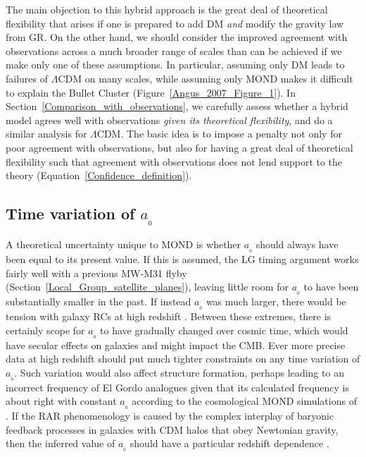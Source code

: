 \documentclass[fleqn,usenatbib,useAMS]{mnras} %
\begin{document}
The main objection to this hybrid approach is the great deal of theoretical flexibility that arises if one is prepared to add DM \emph{and} modify the gravity law from GR. On the other hand, we should consider the improved agreement with observations across a much broader range of scales than can be achieved if we make only one of these assumptions. In particular, assuming only DM leads to failures of $\Lambda$CDM on many scales, while assuming only MOND makes it difficult to explain the Bullet Cluster (Figure~\ref{Angus_2007_Figure_1}). In Section~\ref{Comparison_with_observations}, we carefully assess whether a hybrid model agrees well with observations \emph{given its theoretical flexibility}, and do a similar analysis for $\Lambda$CDM. The basic idea is to impose a penalty not only for poor agreement with observations, but also for having a great deal of theoretical flexibility such that agreement with observations does not lend support to the theory (Equation~\ref{Confidence_definition}).



\subsection{Time variation of $a_{_0}$}
\label{a0_variation}

A theoretical uncertainty unique to MOND is whether $a_{_0}$ should always have been equal to its present value. If this is assumed, the LG timing argument works fairly well with a previous MW-M31 flyby (Section~\ref{Local_Group_satellite_planes}), leaving little room for $a_{_0}$ to have been substantially smaller in the past. If instead $a_{_0}$ was much larger, there would be tension with galaxy RCs at high redshift \citep{Milgrom_2017}. Between these extremes, there is certainly scope for $a_{_0}$ to have gradually changed over cosmic time, which would have secular effects on galaxies \citep{Milgrom_2015_secular} and might impact the CMB. Ever more precise data at high redshift \citep[e.g.][]{Lelli_2021} should put much tighter constraints on any time variation of $a_{_0}$. Such variation would also affect structure formation, perhaps leading to an incorrect frequency of El Gordo analogues given that its calculated frequency is about right with constant $a_{_0}$ \citep{Asencio_2021} according to the cosmological MOND simulations of \citet{Katz_2013}. If the RAR phenomenology is caused by the complex interplay of baryonic feedback processes in galaxies with CDM halos that obey Newtonian gravity, then the inferred value of $a_{_0}$ should have a particular redshift dependence \citep{Garaldi_2018}.
\end{document}
